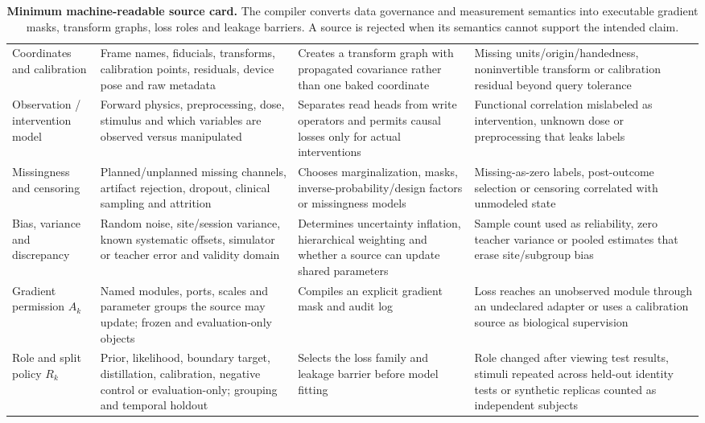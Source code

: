 \begin{table}[!h]
\begin{tabularx}{\textwidth}{@{}p{}p{}p{}X@{}}
Coordinates and calibration &
Frame names, fiducials, transforms, calibration points, residuals, device
pose and raw metadata &
Creates a transform graph with propagated covariance rather than one baked
coordinate &
Missing units/origin/handedness, noninvertible transform or calibration
residual beyond query tolerance\\

Observation / intervention model &
Forward physics, preprocessing, dose, stimulus and which variables are
observed versus manipulated &
Separates read heads from write operators and permits causal losses only for
actual interventions &
Functional correlation mislabeled as intervention, unknown dose or
preprocessing that leaks labels\\

Missingness and censoring &
Planned/unplanned missing channels, artifact rejection, dropout, clinical
sampling and attrition &
Chooses marginalization, masks, inverse-probability/design factors or
missingness models &
Missing-as-zero labels, post-outcome selection or censoring correlated with
unmodeled state\\

Bias, variance and discrepancy &
Random noise, site/session variance, known systematic offsets, simulator or
teacher error and validity domain &
Determines uncertainty inflation, hierarchical weighting and whether a
source can update shared parameters &
Sample count used as reliability, zero teacher variance or pooled estimates
that erase site/subgroup bias\\

Gradient permission \(A_k\) &
Named modules, ports, scales and parameter groups the source may update;
frozen and evaluation-only objects &
Compiles an explicit gradient mask and audit log &
Loss reaches an unobserved module through an undeclared adapter or uses a
calibration source as biological supervision\\

Role and split policy \(R_k\) &
Prior, likelihood, boundary target, distillation, calibration, negative
control or evaluation-only; grouping and temporal holdout &
Selects the loss family and leakage barrier before model fitting &
Role changed after viewing test results, stimuli repeated across held-out
identity tests or synthetic replicas counted as independent subjects\\
\bottomrule
\end{tabularx}
\caption{\textbf{Minimum machine-readable source card.} The compiler converts
data governance and measurement semantics into executable gradient masks,
transform graphs, loss roles and leakage barriers. A source is rejected when
its semantics cannot support the intended claim.}
\label{tab:source-card}
\end{table}

